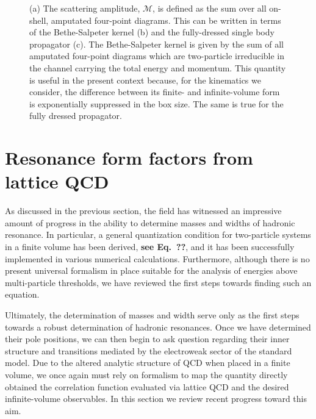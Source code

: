 \documentclass{iopart}
\newcommand{\raul}[0]{\bf \color{blue} }
\theoremstyle{definition}
\begin{document}
{\begin{figure}[t]
\begin{center}
\caption{ (a) The scattering amplitude, $\mathcal M$, is defined as the sum over all on-shell, amputated four-point diagrams. This can be written in terms of the Bethe-Salpeter kernel (b) and the fully-dressed single body propagator (c). The Bethe-Salpeter kernel is given by the sum of all amputated four-point diagrams which are two-particle irreducible in the channel carrying the total energy and momentum. This quantity is useful in the present context because, for the kinematics we consider, the difference between its finite- and infinite-volume form is exponentially suppressed in the box size. The same is true for the fully dressed propagator.}\label{fig:scat_amp}
\end{center}
\end{figure}

\section{Resonance form factors from lattice QCD \label{Sec:formfactors}}

As discussed in the previous section, the field has witnessed an impressive amount of progress in the ability to determine masses and widths of hadronic resonance. In particular, a general quantization condition for two-particle systems in a finite volume has been derived, {\raul see Eq.~{??}}, and it has been successfully implemented in various numerical calculations. Furthermore, although there is no present universal formalism in place suitable for the analysis of energies above multi-particle thresholds, we have reviewed the first steps towards finding such an equation. 

Ultimately, the determination of masses and width serve only as the first steps towards a robust determination of hadronic resonances. Once we have determined their pole positions, we can then begin to ask question regarding their inner structure and transitions mediated by the electroweak sector of the standard model. Due to the altered analytic structure of QCD when placed in a finite volume, we once again must rely on formalism to map the quantity directly obtained the correlation function evaluated via lattice QCD and the desired infinite-volume observables. In this section we review recent progress toward this aim.

}
\end{document}
